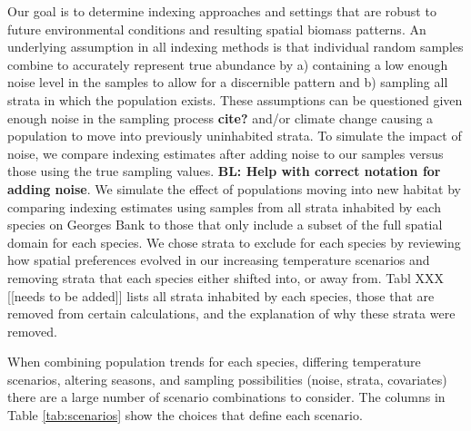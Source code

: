 \documentclass[
  12pt,
]{article}
\begin{document}
Our goal is to determine indexing approaches and settings that are robust to future environmental conditions and resulting spatial biomass patterns. An underlying assumption in all indexing methods is that individual random samples combine to accurately represent true abundance by a) containing a low enough noise level in the samples to allow for a discernible pattern and b) sampling all strata in which the population exists. These assumptions can be questioned given enough noise in the sampling process \textbf{cite?} and/or climate change causing a population to move into previously uninhabited strata. To simulate the impact of noise, we compare indexing estimates after adding noise to our samples versus those using the true sampling values. \textbf{BL: Help with correct notation for adding noise}. We simulate the effect of populations moving into new habitat by comparing indexing estimates using samples from all strata inhabited by each species on Georges Bank to those that only include a subset of the full spatial domain for each species. We chose strata to exclude for each species by reviewing how spatial preferences evolved in our increasing temperature scenarios and removing strata that each species either shifted into, or away from. Tabl XXX {[}{[}needs to be added{]}{]} lists all strata inhabited by each species, those that are removed from certain calculations, and the explanation of why these strata were removed.

When combining population trends for each species, differing temperature scenarios, altering seasons, and sampling possibilities (noise, strata, covariates) there are a large number of scenario combinations to consider. The columns in Table \ref{tab:scenarios} show the choices that define each scenario.

\begin{table}

\caption{\label{tab:scenarios}Each index estimate chooses one condition from each of the following
7 columns. There are 3*3*2*2*2*2*2 = 288 VAST model combinations and 3*3*2*2*2*2 = 144 stratified mean estimates.}
\centering
{}
\end{table}
\end{document}
